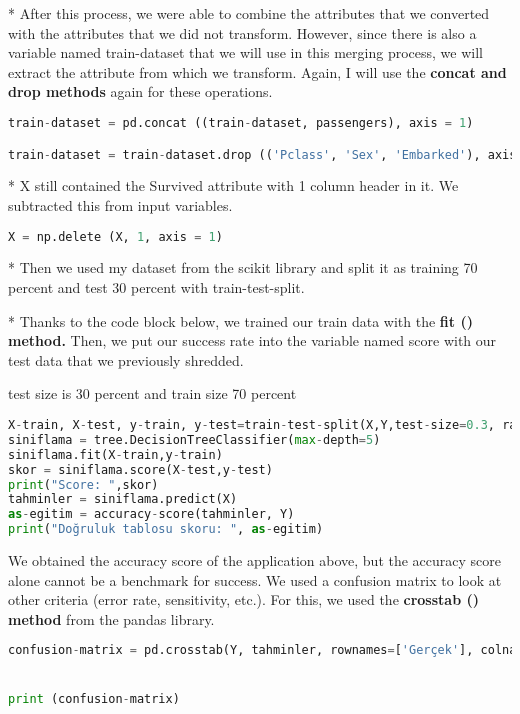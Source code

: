\documentclass[onecolumn]{article}
\begin{document}
* After this process, we were able to combine the attributes that we converted with the attributes that we did not transform. However, since there is also a variable named train-dataset that we will use in this merging process, we will extract the attribute from which we transform. Again, I will use the\textbf{ concat and drop methods} again for these operations.

\begin{lstlisting}[language=Python, caption= concat] 
train-dataset = pd.concat ((train-dataset, passengers), axis = 1)

train-dataset = train-dataset.drop (('Pclass', 'Sex', 'Embarked'), axis = 1)
\end{lstlisting}

* X still contained the Survived attribute with 1 column header in it. We subtracted this from input variables.

\begin{lstlisting}[language=Python, caption= concat] 
X = np.delete (X, 1, axis = 1)
\end{lstlisting}

* Then we used my dataset from the scikit library and split it as
 training 70 percent  and test 30 percent with train-test-split.

* Thanks to the code block below, we trained our train data with the \textbf{fit () method.} Then, we put our success rate into the variable named score with our test data that we previously shredded.


test size is 30 percent and train size 70 percent

\begin{lstlisting}[language=Python, caption= modeling] 
X-train, X-test, y-train, y-test=train-test-split(X,Y,test-size=0.3, random-state=0) 
siniflama = tree.DecisionTreeClassifier(max-depth=5)
siniflama.fit(X-train,y-train)
skor = siniflama.score(X-test,y-test)
print("Score: ",skor)
tahminler = siniflama.predict(X)
as-egitim = accuracy-score(tahminler, Y)
print("Doğruluk tablosu skoru: ", as-egitim)
\end{lstlisting}

 We obtained the accuracy score of the application above, but the
 accuracy score alone cannot be a benchmark for success.
 We used a confusion matrix to look at other criteria (error rate, sensitivity, etc.).
For this, we used the \textbf{crosstab () method} from the pandas library.


\begin{lstlisting}[language=Python, caption= modeling] 
confusion-matrix = pd.crosstab(Y, tahminler, rownames=['Gerçek'], colnames=['Tahmin'])


print (confusion-matrix)

\end{lstlisting}
\end{document}
